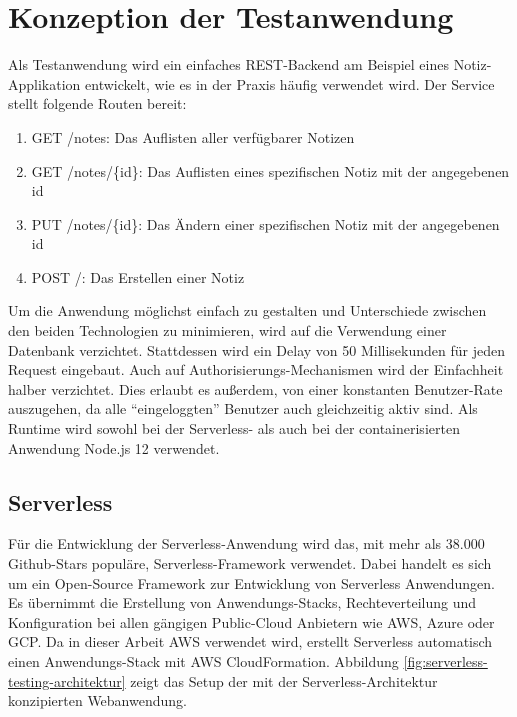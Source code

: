 \section{Konzeption der Testanwendung}
Als Testanwendung wird ein einfaches REST-Backend am Beispiel eines Notiz-Applikation entwickelt, wie es in der Praxis häufig verwendet wird. Der Service stellt folgende Routen bereit:  

\begin{enumerate}
    \item GET /notes: Das Auflisten aller verfügbarer Notizen
    \item GET /notes/\{id\}: Das Auflisten eines spezifischen Notiz mit der angegebenen id
    \item PUT /notes/\{id\}: Das Ändern einer spezifischen Notiz mit der angegebenen id
    \item POST /: Das Erstellen einer Notiz
\end{enumerate}

Um die Anwendung möglichst einfach zu gestalten und Unterschiede zwischen den beiden Technologien zu minimieren, wird auf die Verwendung einer Datenbank verzichtet. Stattdessen wird ein Delay von 50 Millisekunden für jeden Request eingebaut. 
Auch auf Authorisierungs-Mechanismen wird der Einfachheit halber verzichtet. Dies erlaubt es außerdem, von einer konstanten Benutzer-Rate auszugehen, da alle "`eingeloggten"' Benutzer auch gleichzeitig aktiv sind\cite{molyneaux_art_2014}. 
Als Runtime wird sowohl bei der Serverless- als auch bei der containerisierten Anwendung Node.js 12 verwendet.

\subsection{Serverless}
Für die Entwicklung der Serverless-Anwendung wird das, mit mehr als 38.000 Github-Stars populäre, Serverless-Framework\cite{noauthor_serverless_nodate} verwendet. Dabei handelt es sich um ein Open-Source Framework zur Entwicklung von Serverless Anwendungen. Es übernimmt die Erstellung von Anwendungs-Stacks, Rechteverteilung und Konfiguration bei allen gängigen Public-Cloud Anbietern wie AWS, Azure oder GCP. Da in dieser Arbeit AWS verwendet wird, erstellt Serverless automatisch einen Anwendungs-Stack mit AWS CloudFormation. 
Abbildung \ref{fig:serverless-testing-architektur} zeigt das Setup der mit der Serverless-Architektur konzipierten Webanwendung.

